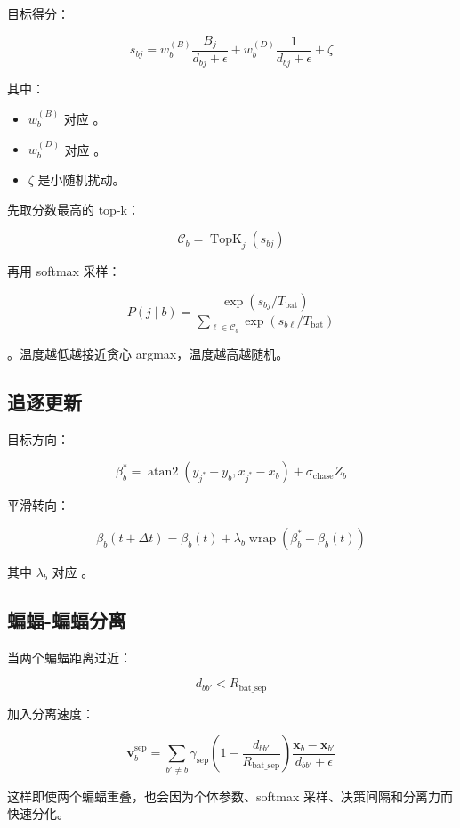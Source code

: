 \documentclass[UTF8]{ctexart}
\begin{document}
目标得分：

\[
s_{bj}
=
w_b^{(B)}
\frac{B_j}{d_{bj}+\epsilon}
+
w_b^{(D)}
\frac{1}{d_{bj}+\epsilon}
+
\zeta
\]

其中：

\begin{itemize}
\item $w_b^{(B)}$ 对应 \texttt{}。
\item $w_b^{(D)}$ 对应 \texttt{}。
\item $\zeta$ 是小随机扰动。
\end{itemize}

先取分数最高的 top-k：

\[
\mathcal{C}_b=\operatorname{TopK}_j(s_{bj})
\]

再用 softmax 采样：

\[
P(j\mid b)
=
\frac{
\exp(s_{bj}/T_{\text{bat}})
}{
\sum_{\ell\in \mathcal{C}_b}
\exp(s_{b\ell}/T_{\text{bat}})
}
\]

\texttt{}。温度越低越接近贪心 argmax，温度越高越随机。

\subsection{追逐更新}

目标方向：

\[
\beta_b^*
=
\operatorname{atan2}(y_{j^*}-y_b,x_{j^*}-x_b)
+
\sigma_{\text{chase}}Z_b
\]

平滑转向：

\[
\beta_b(t+\Delta t)
=
\beta_b(t)
+
\lambda_b
\operatorname{wrap}(\beta_b^*-\beta_b(t))
\]

其中 $\lambda_b$ 对应 \texttt{}。

\subsection{蝙蝠-蝙蝠分离}

当两个蝙蝠距离过近：

\[
d_{bb'}<R_{\text{bat\_sep}}
\]

加入分离速度：

\[
\mathbf{v}_b^{\text{sep}}
=
\sum_{b'\ne b}
\gamma_{\text{sep}}
\left(1-\frac{d_{bb'}}{R_{\text{bat\_sep}}}\right)
\frac{\mathbf{x}_b-\mathbf{x}_{b'}}{d_{bb'}+\epsilon}
\]

这样即使两个蝙蝠重叠，也会因为个体参数、softmax 采样、决策间隔和分离力而快速分化。
\end{document}
